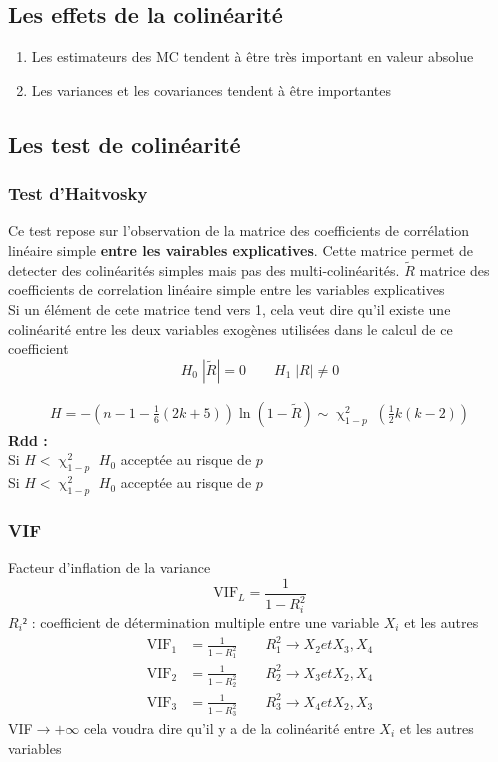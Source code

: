 \documentclass{article}
\begin{document}
\subsection{Les effets de la colinéarité}
\begin{enumerate}
    \item Les estimateurs des MC tendent à être très important en valeur absolue
    \item Les variances et les covariances tendent à être importantes
\end{enumerate}
\subsection{Les test de colinéarité}
\subsubsection{Test d'Haitvosky}
Ce test repose sur l'observation de la matrice des coefficients de corrélation linéaire simple
\textbf{entre les vairables explicatives}. Cette matrice permet de detecter des colinéarités
simples mais pas des multi-colinéarités.
 $\tilde{R}$ matrice des coefficients de correlation linéaire simple entre les variables
    explicatives \\
Si un élément de cete matrice tend vers 1, cela veut dire qu'il existe une colinéarité entre
les deux variables exogènes utilisées dans le calcul de ce coefficient
\begin{equation*}
    H_0 \; |\tilde{R}| = 0 \qquad H_1 \; |R| \neq 0
\end{equation*}

\begin{equation*}
    \begin{split}
        H = - (n-1-\frac{1}{6}(2k +5))\ln(1-\tilde{R}) \sim \upchi^2_{1-p} \; (\frac{1}{2}k(k-2))
    \end{split}
\end{equation*}
\textbf{Rdd :}\\
Si $H< \upchi^2_{1-p}$ $H_0$ acceptée au risque de $p$ \\
Si $H< \upchi^2_{1-p}$ $H_0$ acceptée au risque de $p$

\subsubsection{VIF}
Facteur d'inflation de la variance
\begin{equation*}
    \text{VIF}_L = \frac{1}{1-R_i^2}
\end{equation*}
$R_i²$ : coefficient de détermination multiple entre une variable $X_i$ et les autres
\begin{equation*}
    \begin{split}
        \text{VIF}_1 &= \frac{1}{1-R_1^2} \qquad R_1^2 \rightarrow X_2 et X_3,X_4 \\
        \text{VIF}_2 &= \frac{1}{1-R_2^2} \qquad R_2^2 \rightarrow X_3 et X_2,X_4 \\
        \text{VIF}_3 &= \frac{1}{1-R_3^2} \qquad R_3^2 \rightarrow X_4 et X_2,X_3 
    \end{split}
\end{equation*}
VIF$\rightarrow + \infty$ cela voudra dire qu'il y a de la colinéarité entre $X_i$ et les
autres variables 
\end{document}

